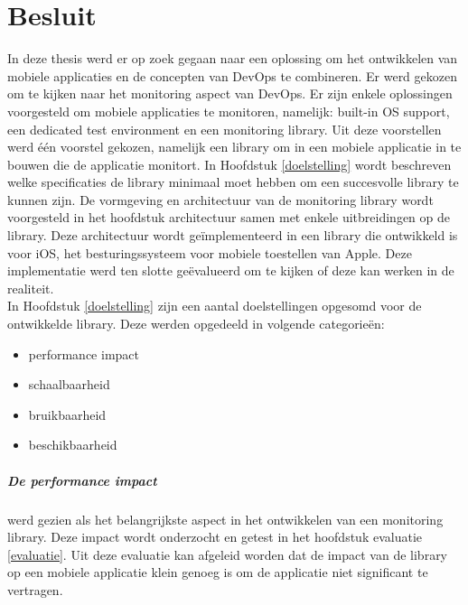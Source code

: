\chapter{Besluit}
\label{besluit}


In deze thesis werd er op zoek gegaan naar een oplossing om het ontwikkelen van mobiele applicaties en de concepten van DevOps te combineren. Er werd gekozen om te kijken naar het monitoring aspect van DevOps. Er zijn enkele oplossingen voorgesteld om mobiele applicaties te monitoren, namelijk: built-in OS support, een dedicated test environment en een monitoring library. Uit deze voorstellen werd \'e\'en voorstel gekozen, namelijk een library om in een mobiele applicatie in te bouwen die de applicatie monitort. In Hoofdstuk \ref{doelstelling} wordt beschreven welke specificaties de library minimaal moet hebben om een succesvolle library te kunnen zijn. De vormgeving en architectuur van de monitoring library wordt voorgesteld in het hoofdstuk architectuur samen met enkele uitbreidingen op de library. Deze architectuur wordt ge\"implementeerd in een library die ontwikkeld is voor iOS, het besturingssysteem voor mobiele toestellen van Apple. Deze implementatie werd ten slotte ge\"evalueerd om te kijken of deze kan werken in de realiteit. \\


In Hoofdstuk \ref{doelstelling} zijn een aantal doelstellingen opgesomd voor de ontwikkelde library. Deze werden opgedeeld in volgende categorie\"en: 
\begin{itemize}
\item performance impact
\item schaalbaarheid
\item bruikbaarheid
\item beschikbaarheid
\end{itemize}

\paragraph{De performance impact} werd gezien als het belangrijkste aspect in het ontwikkelen van een monitoring library. Deze impact wordt onderzocht en getest in het hoofdstuk evaluatie \ref{evaluatie}. Uit deze evaluatie kan afgeleid worden dat de impact van de library op een mobiele applicatie klein genoeg is om de applicatie niet significant te vertragen. \\


